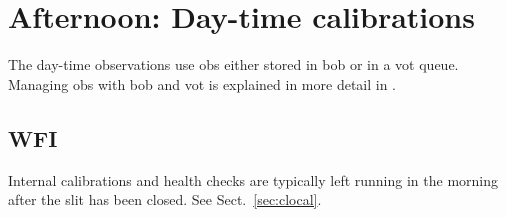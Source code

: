 \documentclass[11pt,fleqn,a4paper]{book}
\begin{document}



\chapter{Afternoon: Day-time calibrations}
\label{chap:daycal}

The day-time observations use \glspl{ob} either stored in \gls{bob} or in a
\gls{vot} queue.  Managing \glspl{ob} with \gls{bob} and \gls{vot} is
explained in more detail in .

\section{WFI}
Internal calibrations and health checks are typically left running in the morning after the \gls{slit} has been closed.  See Sect.~\ref{sec:clocal}.
\end{document}
